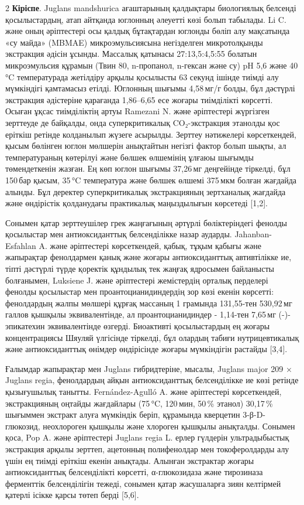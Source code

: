 \begin{multicols}{2}
{\bfseries Кіріспе}. Juglans mandshurica ағаштарының қалдықтары биологиялық
белсенді қосылыстардың, атап айтқанда юглонның әлеуетті көзі болып
табылады. Li C. және оның әріптестері осы қалдық бұтақтардан юглонды
бөліп алу мақсатында «су майда» (MBMAE) микроэмульсиясына негізделген
микротолқынды экстракция әдісін ұсынды. Массалық қатынасы 27:13,5:4,5:55
болатын микроэмульсия құрамын (Твин 80, n-пропанол, n-гексан және су) pH
5,6 және 40\,°C температурада жетілдіру арқылы қосылысты 63 секунд
ішінде тиімді алу мүмкіндігі қамтамасыз етілді. Юглонның шығымы
4,58\,мг/г болды, бұл дәстүрлі экстракция әдістеріне қарағанда
1,86--6,65 есе жоғары тиімділікті көрсетті. Осыған ұқсас тиімділіктің
артуы Ramezani N. және әріптестері жүргізген зерттеуде де байқалды, онда
суперкритикалық CO₂-экстракция этанолды қос еріткіш ретінде колданылып
жүзеге асырылды. Зерттеу нәтижелері көрсеткендей, қысым бөлінген юглон
мөлшерін анықтайтын негізгі фактор болып шықты, ал температураның
көтерілуі және бөлшек өлшемінің ұлғаюы шығымды төмендеткенін жазған. Ең
көп юглон шығымы 37,26\,мг деңгейінде тіркелді, бұл 150\,бар қысым,
35\,°C температура және бөлшек өлшемі 375\,мкм болған жағдайда алынды.
Бұл деректер суперкритикалық экстракцияның зертханалық жағдайда және
өндірістік қолданудағы практикалық маңыздылығын көрсетеді {[}1,2{]}.

Сонымен қатар зерттеушілер грек жаңғағының әртүрлі бөліктеріндегі
фенолды қосылыстар мен антиоксиданттық белсенділікке назар аударды.
Jahanban-Esfahlan A. және әріптестері көрсеткендей, қабық, тұқым қабығы
және жапырақтар фенолдармен қанық және жоғары антиоксиданттық
автивтілікке ие, тіпті дәстүрлі түрде қоректік құндылық тек жаңғақ
ядросымен байланысты болғанымен, Luksiene J. және әріптестері
жемістердің орталық перделері фенолды қосылыстар мен
проантоцианидиндердің зор көзі екенін көрсетті: фенолдардың жалпы
мөлшері құрғақ массаның 1 грамында 131,55-тен 530,92\,мг галлов қышқылы
эквивалентінде, ал проантоцианидиндер - 1,14-тен 7,65\,мг (-)-эпикатехин
эквивалентінде өзгерді. Биоактивті қосылыстардың ең жоғары
концентрациясы Шяуляй үлгісінде тіркелді, бұл олардың табиғи
нутрицевтикалық және антиоксиданттық өнімдер өндірісінде жоғары
мүмкіндігін растайды {[}3,4{]}.

Ғалымдар жапырақтар мен Juglans гибридтеріне, мысалы, Juglans major 209
× Juglans regia, фенолдардың айқын антиоксиданттық белсенділікке ие көзі
ретінде қызығушылық танытты. Fernández-Agulló A. және әріптестері
көрсеткендей, экстракцияның оңтайды жағдайлары (75\,°C, 120\,мин, 50\,\%
этанол) 30,17\,\% шығыммен экстракт алуға мүмкіндік беріп, құрамында
кверцетин 3-β-D-глюкозид, неохлороген қышқылы және хлороген қышқылы
анықталды. Сонымен қоса, Pop A. және әріптестері Juglans regia L. ерлер
гүлдерін ультрадыбыстық экстракция арқылы зерттеп, ацетонның
полифенолдар мен токоферолдарды алу үшін ең тиімді еріткіш екенін
анықтады. Алынған экстрактар жоғары антиоксиданттық белсенділікті
көрсетті, α-глюкозидаза және тирозиназа ферменттік белсенділігін тежеді,
сонымен қатар жасушаларға зиян келтірмей қатерлі ісікке қарсы төтеп
берді {[}5,6{]}.


\end{multicols}
